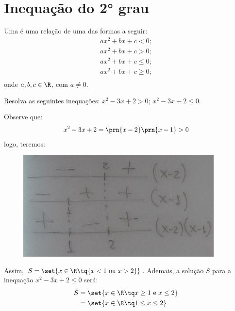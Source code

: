 \section{Inequação do 2° grau}

\begin{definition}
Uma  é uma relação de uma das formas
a seguir:
%
\begin{gather*}
ax^2 +bx + c <0;\\
ax^2 +bx + c>0;\\
ax^2 +bx + c \le 0;\\
ax^2 +bx + c \ge 0;\\
\end{gather*}
%
onde $a, b, c \in \R$, com $ a \ne 0$.
\end{definition}

\begin{example}
Resolva as seguintes inequações: $x^2 -3x +2 > 0$; $x^2 -3x +2 \le 0$.
\end{example}

\begin{solution}
Observe que: 
%
\begin{align*}
x^2-3x+2=\prn{x-2}\prn{x-1}>0
\end{align*}
%
\noindent logo, teremos:

\begin{figure}[H]
\centering
\includegraphics{../../res/img/[ok]photo_2018-08-24_22-55-35.jpg}
\caption{}
\end{figure}

Assim, $S = \set{x \in \R \tq{x<1 \text{ ou } x>2}}$. Ademais, a solução $\bar{S}$ para a inequação $x^2-3x+2\le0$ será:
%
\begin{align*}
\bar{S} &= \set{x \in \R \tq x \ge 1 \text{ e } x \le 2} \\
		&= \set{x \in \R \tq 1 \le x \le 2} 
\end{align*}
\end{solution}

